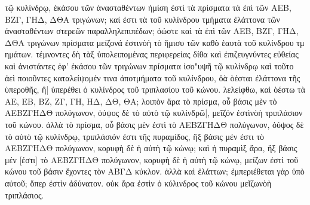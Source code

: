 \begin{Parallel}{}{}
{{τῷ κυλίνδρῳ, ἑκάσου τῶν ἀνασταθέντων ἡμίση ἐστὶ τὰ πρίσματα τὰ ἐπὶ τῶν
ΑΕΒ, ΒΖΓ, ΓΗΔ, ΔΘΑ τριγώνων;  καί ἐστι τὰ τοῦ κυλίνδρου τμήματα ἐλάττονα τῶν ἀνασταθέντων
στερεῶν παραλληλεπιπέδων; ὁώστε καὶ τὰ ἐπὶ τῶν ΑΕΒ, ΒΖΓ, ΓΗΔ, ΔΘΑ τριγώνων πρίσματα μείζονά
ἐστινὸὴ τὸ ἥμισυ τῶν καθὸ ἑαυτὰ τοῦ κυλίνδρου τμ  ημάτων. τέμνοντες δὴ τὰξ ὑπολειπομένας περιφερείας
δίθα καὶ ἐπιζευγνύντες εὐθείας καὶ ἀνιστάντες 
ἐφ' ἑκάσου τῶν τριγώνων πρίσματα ἰσο"υψῆ τῷ κυλίνδρῳ καὶ τοῦτο ἀεὶ ποιοῦντες καταλείψομέν
τινα ἀποτμήματα τοῦ κυλίνδρου, ὁὰ ὸέσται ἐλάττονα τῆς ὑπεροθῆς, ἣ| ὑπερέθει ὁ κυλίνδρος τοῦ
τριπλασίου τοῦ κώνου. λελείφθω, καὶ ὸέστω τὰ ΑΕ, ΕΒ, ΒΖ, ΖΓ, ΓΗ, ΗΔ, ΔΘ, ΘΑ; λοιπὸν ἄρα τὸ πρίσμα, οὗ
βάσις μὲν τὸ ΑΕΒΖΓΗΔΘ πολύγωνον, ὁύψος δὲ τὸ αὐτὸ τῷ κυλίνδρῶ|, μεῖζόν ἐστὶνὸὴ
τριπλάσιον τοῦ κώνου. 
ἀλλὰ τὸ πρίσμα, οὗ βάσις μὲν ἐστὶ τὸ ΑΕΒΖΓΗΔΘ πολύγωνον, ὁύψος δὲ τὸ αὐτὸ τῷ κυλίνδρῳ, τριπλάσιόν
ἐστι τῆς πυραμίδος, ἣξ βάσις μέν ἐστι τὸ ΑΕΒΖΓΗΔΘ
πολύγωνον, 
κορυφὴ δὲ
ἡ αὐτὴ τῷ κώνῳ; καὶ ἡ πυραμὶξ ἄρα, ἣξ βάσις μέν [ἐστι] τὸ ΑΕΒΖΓΗΔΘ πολύγωνον, κορυφὴ
δὲ ἡ αὐτὴ τῷ κώνῳ, μείζων ἐστὶ τοῦ κώνου τοῦ βάσιν ἔχοντες τὸν ΑΒΓΔ κύκλον.
 ἀλλὰ καὶ
ἐλάττων; ἐμπεριέθεται γὰρ ὑπὸ αὐτοῦ; ὅπερ ἐστὶν ἀδύνατον. οὐκ ἄρα ἐστὶν ὁ κύλινδρος
τοῦ κώνου μεῖζωνὸὴ τριπλάσιος.}


}
\end{Parallel}
